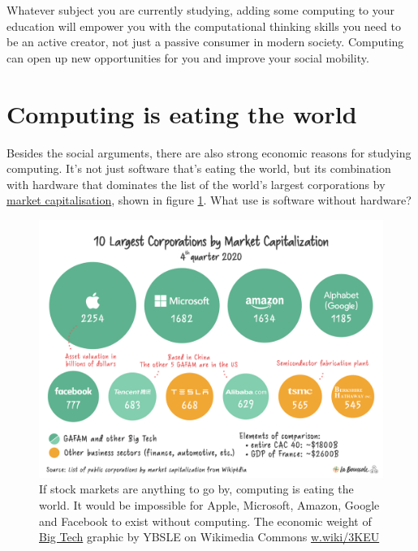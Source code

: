 \documentclass[
]{book}
\begin{document}
Whatever subject you are currently studying, adding some computing to your education will empower you with the computational thinking skills you need to be an active creator, not just a passive consumer in modern society. Computing can open up new opportunities for you and improve your social mobility.

\hypertarget{eating}{%
\section{Computing is eating the world}\label{eating}}

Besides the social arguments, there are also strong economic reasons for studying computing. It's not just software that's eating the world, but its combination with hardware that dominates the list of the world's largest corporations by \href{https://en.wikipedia.org/wiki/Market_capitalization}{market capitalisation}, shown in figure \ref{fig:market-fig}. What use is software without hardware?

\begin{figure}

{\centering \includegraphics[width=1\linewidth]{images/Market_Capitalisation} 

}

\caption{If stock markets are anything to go by, computing is eating the world. It would be impossible for Apple, Microsoft, Amazon, Google and Facebook to exist without computing. The economic weight of \href{https://en.wikipedia.org/wiki/Big_Tech}{Big Tech} graphic by YBSLE on Wikimedia Commons \href{https://w.wiki/3KEU}{w.wiki/3KEU}}\label{fig:market-fig}
\end{figure}
\end{document}
